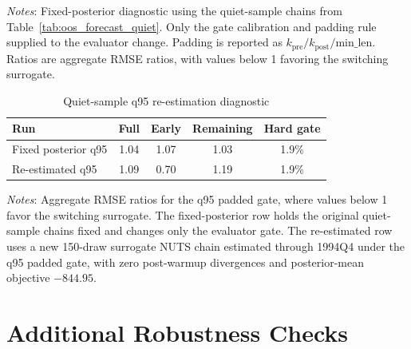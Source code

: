 \documentclass[12pt]{article}
\theoremstyle{plain}
\theoremstyle{definition}
\theoremstyle{remark}
\newcommand{\tablenotes}[1]{%
  \par\vspace{0.5em}%
  \noindent\begin{minipage}{\textwidth}%
  \raggedright\footnotesize #1%
  \end{minipage}\par%
}
\begin{document}
\begin{table}[htbp]
\centering
\caption{Quiet-sample gate-recalibration diagnostic}
\label{tab:oos_gate_recalibration}
\small
{}
\smallskip
\tablenotes{\textit{Notes}: Fixed-posterior diagnostic using the quiet-sample chains from Table~\ref{tab:oos_forecast_quiet}. Only the gate calibration and padding rule supplied to the evaluator change. Padding is reported as $k_{\mathrm{pre}}/k_{\mathrm{post}}/\text{min\_len}$. Ratios are aggregate RMSE ratios, with values below 1 favoring the switching surrogate.}
\end{table}

\begin{table}[htbp]
\centering
\caption{Quiet-sample q95 re-estimation diagnostic}
\label{tab:oos_q95_reestimated}
\small
\begin{tabular}{lcccc}
\toprule
Run & Full & Early & Remaining & Hard gate \\
\midrule
Fixed posterior q95 & 1.04 & 1.07 & 1.03 & 1.9\% \\
Re-estimated q95 & 1.09 & 0.70 & 1.19 & 1.9\% \\
\bottomrule
\end{tabular}
\smallskip
\tablenotes{\textit{Notes}: Aggregate RMSE ratios for the q95 padded gate, where values below 1 favor the switching surrogate. The fixed-posterior row holds the original quiet-sample chains fixed and changes only the evaluator gate. The re-estimated row uses a new 150-draw surrogate NUTS chain estimated through 1994Q4 under the q95 padded gate, with zero post-warmup divergences and posterior-mean objective $-844.95$.}
\end{table}


\section{Additional Robustness Checks}
\label{app:robustness_extended}
\end{document}
